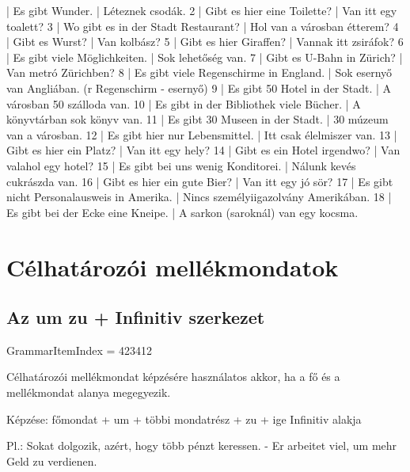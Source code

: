\documentclass{article}
\newenvironment{desc}{\verbatim}{\endverbatim}
\newenvironment{exmp}{\verbatim}{\endverbatim}
\begin{document}
\begin{exmp}
1 | Es gibt Wunder. | Léteznek csodák.
2 | Gibt es hier eine Toilette? | Van itt egy toalett?
3 | Wo gibt es in der Stadt Restaurant? | Hol van a városban étterem?
4 | Gibt es Wurst? | Van kolbász?
5 | Gibt es hier Giraffen? | Vannak itt zsiráfok?
6 | Es gibt viele Möglichkeiten. | Sok lehetőség van.
7 | Gibt es U-Bahn in Zürich? | Van metró Zürichben?
8 | Es gibt viele Regenschirme in England. | Sok esernyő van Angliában. (r Regenschirm - esernyő)
9 | Es gibt 50 Hotel in der Stadt. | A városban 50 szálloda van.
10 | Es gibt in der Bibliothek viele Bücher. | A könyvtárban sok könyv van.
11 | Es gibt 30 Museen in der Stadt. | 30 múzeum van a városban.
12 | Es gibt hier nur Lebensmittel. | Itt csak élelmiszer van.
13 | Gibt es hier ein Platz? | Van itt egy hely?
14 | Gibt es ein Hotel irgendwo? | Van valahol egy hotel?
15 | Es gibt bei uns wenig Konditorei. | Nálunk kevés cukrászda van.
16 | Gibt es hier ein gute Bier? | Van itt egy jó sör?
17 | Es gibt nicht Personalausweis in Amerika. | Nincs személyiigazolvány Amerikában.
18 | Es gibt bei der Ecke eine Kneipe. | A sarkon (saroknál) van egy kocsma.
\end{exmp}

\section{Célhatározói mellékmondatok}

\subsection{Az um zu + Infinitiv szerkezet}

GrammarItemIndex = 423412

\begin{desc}
Célhatározói mellékmondat képzésére használatos akkor, ha a fő és a mellékmondat alanya megegyezik.

Képzése:
főmondat + um + többi mondatrész + zu + ige Infinitiv alakja

Pl.: Sokat dolgozik, azért, hogy több pénzt keressen. - Er arbeitet viel, um mehr Geld zu verdienen.
\end{desc}
\end{document}
